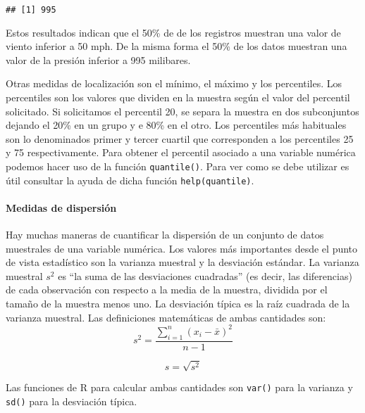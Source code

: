 \documentclass[
]{book}
\newenvironment{Shaded}{\begin{snugshade}}{\end{snugshade}}
\newcommand{\FunctionTok}[1]{\textcolor[rgb]{0.00,0.00,0.00}{#1}}
\newcommand{\NormalTok}[1]{#1}
\newcommand{\SpecialCharTok}[1]{\textcolor[rgb]{0.00,0.00,0.00}{#1}}
\begin{document}
\begin{verbatim}
## [1] 995
\end{verbatim}

Estos resultados indican que el 50\% de de los registros muestran una valor de viento inferior a 50 mph. De la misma forma el 50\% de los datos muestran una valor de la presión inferior a 995 milibares.

Otras medidas de localización son el mínimo, el máximo y los percentiles. Los percentiles son los valores que dividen en la muestra según el valor del percentil solicitado. Si solicitamos el percentil 20, se separa la muestra en dos subconjuntos dejando el 20\% en un grupo y e 80\% en el otro. Los percentiles más habituales son lo denominados primer y tercer cuartil que corresponden a los percentiles 25 y 75 respectivamente. Para obtener el percentil asociado a una variable numérica podemos hacer uso de la función \texttt{quantile()}. Para ver como se debe utilizar es útil consultar la ayuda de dicha función \texttt{help(quantile)}.

\hypertarget{medidas-de-dispersiuxf3n}{%
\paragraph{Medidas de dispersión}\label{medidas-de-dispersiuxf3n}}

Hay muchas maneras de cuantificar la dispersión de un conjunto de datos muestrales de una variable numérica. Los valores más importantes desde el punto de vista estadístico son la varianza muestral y la desviación estándar. La varianza muestral \(s^2\) es ``la suma de las desviaciones cuadradas'' (es decir, las diferencias) de cada observación con respecto a la media de la muestra, dividida por el tamaño de la muestra menos uno. La desviación típica es la raíz cuadrada de la varianza muestral. Las definiciones matemáticas de ambas cantidades son: \begin{equation} 
  s^2 = \frac{\sum_{i=1}^n (x_i-\bar{x})^2}{n-1}
  \label{eq:var}
\end{equation}

\begin{equation} 
  s = \sqrt{s^2}
  \label{eq:sd}
\end{equation}

Las funciones de R para calcular ambas cantidades son \texttt{var()} para la varianza y \texttt{sd()} para la desviación típica.

\begin{Shaded}
\end{Shaded}
\end{document}
